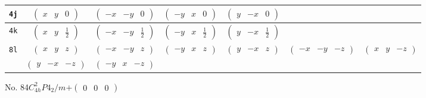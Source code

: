 \documentclass[fleqn,9pt,landscape]{jsarticle}
\begin{document}
\begin{center}
\begin{longtable}{ccccccc}
{\tt 4j} & $ \begin{pmatrix} x & y & 0 \end{pmatrix} $ & $ \begin{pmatrix} - x & - y & 0 \end{pmatrix} $ & $ \begin{pmatrix} - y & x & 0 \end{pmatrix} $ & $ \begin{pmatrix} y & - x & 0 \end{pmatrix} $ & $  $ & $  $ \\ \hline
{\tt 4k} & $ \begin{pmatrix} x & y & \frac{1}{2} \end{pmatrix} $ & $ \begin{pmatrix} - x & - y & \frac{1}{2} \end{pmatrix} $ & $ \begin{pmatrix} - y & x & \frac{1}{2} \end{pmatrix} $ & $ \begin{pmatrix} y & - x & \frac{1}{2} \end{pmatrix} $ & $  $ & $  $ \\ \hline
{\tt 8l} & $ \begin{pmatrix} x & y & z \end{pmatrix} $ & $ \begin{pmatrix} - x & - y & z \end{pmatrix} $ & $ \begin{pmatrix} - y & x & z \end{pmatrix} $ & $ \begin{pmatrix} y & - x & z \end{pmatrix} $ & $ \begin{pmatrix} - x & - y & - z \end{pmatrix} $ & $ \begin{pmatrix} x & y & - z \end{pmatrix} $ \\
& $ \begin{pmatrix} y & - x & - z \end{pmatrix} $ & $ \begin{pmatrix} - y & x & - z \end{pmatrix} $ & $  $ & $  $ & $  $ & $  $ \\
\end{longtable}
\end{center}
\newpage
No. 84\quad$C_{4h}^{2}$\quad$P4_2/m$\quad[ tetragonal ]\quad$+\begin{pmatrix} 0 & 0 & 0 \end{pmatrix}$
\end{document}
